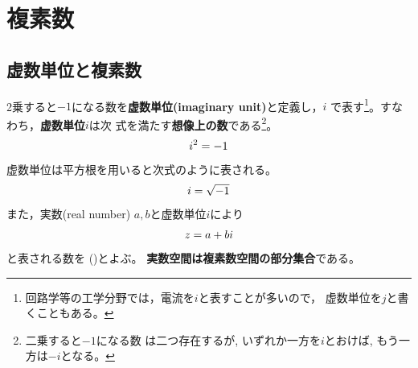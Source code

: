 \documentclass[twocolumn,11pt]{jarticle}
\begin{document}


\newpage
\section{複素数}

\subsection{虚数単位と複素数}
2乗すると$-1$になる数を\textbf{虚数単位(imaginary unit)}と定義し，$i$
で表す\footnote{回路学等の工学分野では，電流を$i$と表すことが多いので，
  虚数単位を$j$と書くこともある。}。すなわち，\textbf{虚数単位}$i$は次
  式を満たす\textbf{想像上の数}である\footnote{二乗すると$-1$になる数
    は二つ存在するが, いずれか一方を$i$とおけば, もう一方は$-i$となる。}。
\begin{align}
  i^2=-1\notag
\end{align}
虚数単位は平方根を用いると次式のように表される。
\begin{align}
  i=\sqrt{-1}\notag
\end{align}
また，実数(real number) $a,b$と虚数単位$i$により
\begin{align}
  z=a+bi\notag
\end{align}
と表される数を
()とよぶ。
\textbf{実数空間は複素数空間の部分集合}である。
\end{document}
